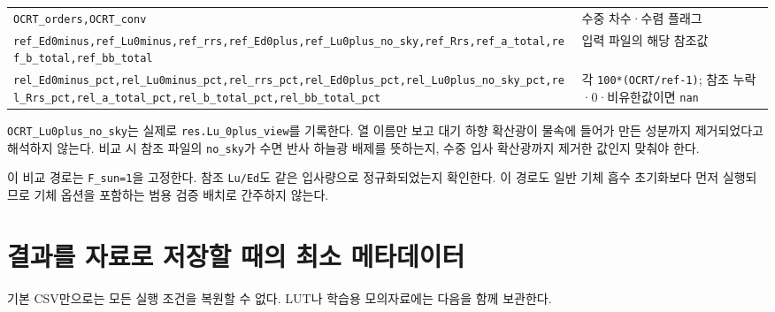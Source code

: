 {\begin{longtable}{@{}>{\raggedright\arraybackslash}p{}>{\raggedright\arraybackslash}p{}@{}}
\texttt{OCRT\_\allowbreak{}orders,\allowbreak{}OCRT\_\allowbreak{}conv} & 수중 차수·수렴 플래그 \\
\texttt{ref\_\allowbreak{}Ed0minus,\allowbreak{}ref\_\allowbreak{}Lu0minus,\allowbreak{}ref\_\allowbreak{}rrs,\allowbreak{}ref\_\allowbreak{}Ed0plus,\allowbreak{}ref\_\allowbreak{}Lu0plus\_\allowbreak{}no\_\allowbreak{}sky,\allowbreak{}ref\_\allowbreak{}Rrs,\allowbreak{}ref\_\allowbreak{}a\_\allowbreak{}total,\allowbreak{}ref\_\allowbreak{}b\_\allowbreak{}total,\allowbreak{}ref\_\allowbreak{}bb\_\allowbreak{}total} & 입력 파일의 해당 참조값 \\
\texttt{rel\_\allowbreak{}Ed0minus\_\allowbreak{}pct,\allowbreak{}rel\_\allowbreak{}Lu0minus\_\allowbreak{}pct,\allowbreak{}rel\_\allowbreak{}rrs\_\allowbreak{}pct,\allowbreak{}rel\_\allowbreak{}Ed0plus\_\allowbreak{}pct,\allowbreak{}rel\_\allowbreak{}Lu0plus\_\allowbreak{}no\_\allowbreak{}sky\_\allowbreak{}pct,\allowbreak{}rel\_\allowbreak{}Rrs\_\allowbreak{}pct,\allowbreak{}rel\_\allowbreak{}a\_\allowbreak{}total\_\allowbreak{}pct,\allowbreak{}rel\_\allowbreak{}b\_\allowbreak{}total\_\allowbreak{}pct,\allowbreak{}rel\_\allowbreak{}bb\_\allowbreak{}total\_\allowbreak{}pct} & 각 \texttt{100*(OCRT/\allowbreak{}ref-1)}; 참조 누락·0·비유한값이면 \texttt{nan} \\
\end{longtable}
}

\texttt{OCRT\_\allowbreak{}Lu0plus\_\allowbreak{}no\_\allowbreak{}sky}는 실제로 \texttt{res.\allowbreak{}Lu\_\allowbreak{}0plus\_\allowbreak{}view}를 기록한다. 열 이름만 보고 대기 하향 확산광이 물속에 들어가 만든 성분까지 제거되었다고 해석하지 않는다. 비교 시 참조 파일의 \texttt{no\_\allowbreak{}sky}가 수면 반사 하늘광 배제를 뜻하는지, 수중 입사 확산광까지 제거한 값인지 맞춰야 한다.

이 비교 경로는 \texttt{F\_\allowbreak{}sun=\allowbreak{}1}을 고정한다. 참조 \texttt{Lu/\allowbreak{}Ed}도 같은 입사량으로 정규화되었는지 확인한다. 이 경로도 일반 기체 흡수 초기화보다 먼저 실행되므로 기체 옵션을 포함하는 범용 검증 배치로 간주하지 않는다.

\section{결과를 자료로 저장할 때의 최소 메타데이터}
\label{sec:auto:05_output_formats:10}
기본 CSV만으로는 모든 실행 조건을 복원할 수 없다. LUT나 학습용 모의자료에는 다음을 함께 보관한다.

